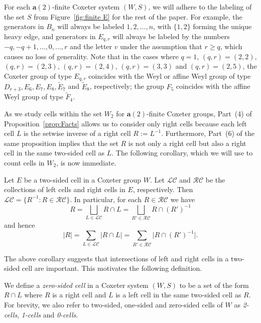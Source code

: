 \documentclass[ALCO,Unicode,published]{cedram}
\newcommand{\calc}{\mathcal{C}}
\newcommand{\call}{\mathcal{L}}
\newcommand{\calr}{\mathcal{R}}
\newcommand{\la}{\mathbf{a}}
\newcommand{\inverse}{^{-1}}
\newcommand{\abs}[1]{\lvert #1 \rvert}
\newcommand{\Abs}[1]{\bigg| #1 \bigg|}
\begin{document}
\begin{remark}
    \label{rmk:labels}
    For each $\la(2)$-finite Coxeter system $(W,S)$, we will adhere to the labeling of the set $S$
    from Figure~\ref{fig:finite E} for the rest of the paper. For example, the generators in $B_n$ will
    always be labeled $1,2,\dots,n$, with $\{1,2\}$ forming the unique heavy edge, and generators in
    $E_{q,r}$ will always be labeled by the numbers $-q,-q+1,\dots, 0,\dots, r$ and the letter $v$
    under the assumption that $r\ge q$, which causes no loss of generality. Note that in the cases
    where $q=1$, $(q,r)=(2,2)$, $(q,r)=(2,3)$, $(q,r)=(2,4)$, $(q,r)=(3,3)$ and $(q,r)=(2,5)$, the Coxeter
    group of type $E_{q,r}$ coincides with the Weyl or affine Weyl group of type $D_{r+3}, E_6, E_7,
    E_8, \tilde E_7$ and $\tilde E_8$, respectively; the group $F_5$ coincides with the affine Weyl
    group of type $\tilde F_4$.
\end{remark}

As we study cells within the set $W_2$ for $\la(2)$-finite Coxeter groups, Part~(4) of
Proposition~\ref{prop:Facts} allows us to consider only right cells because each left cell $L$ is the setwise
inverse of a right cell $R:=L^{-1}$.  Furthermore, Part~(6) of the same proposition implies that the
set $R$ is not only a right cell but also a right cell in the same two-sided cell as $L$. The
following corollary, which we will use to count cells in $W_2$, is now immediate. 

\begin{corollary}
\label{coro:intersection} Let $E$ be a two-sided cell in a Coxeter group $W$. Let $\call\calc$ and
      $\calr\calc$ be the collections of left cells and right cells in $E$, respectively. Then
      $\call\calc=\{R\inverse: R\in \calr\calc\}$. In particular, for each $R\in \calr\calc$ we have
      \[ R=\bigsqcup_{L\in\call\calc}R\cap L=\bigsqcup_{R'\in \calr\calc}R\cap (R')\inverse \] and
      hence \[ \abs{R}=\sum_{L\in\call\calc}\Abs{R\cap L}=\sum_{R'\in \calr\calc}\Abs{R\cap
      (R')\inverse}.  \]
\end{corollary}

The above corollary suggests that intersections of left and right cells in a two-sided cell are
important. This motivates the following definition.
\begin{definition} 
    We define a \emph{zero-sided cell} in a Coxeter system $(W,S)$ to be a set of the form $R\cap L$
    where $R$ is a right cell and $L$ is a left cell in the same two-sided cell as $R$.  For
    brevity, we also refer to two-sided, one-sided and zero-sided cells of $W$ as \emph{2-cells},
    \emph{1-cells} and \emph{0-cells}.
    \label{def:0cells}
\end{definition}
\end{document}
